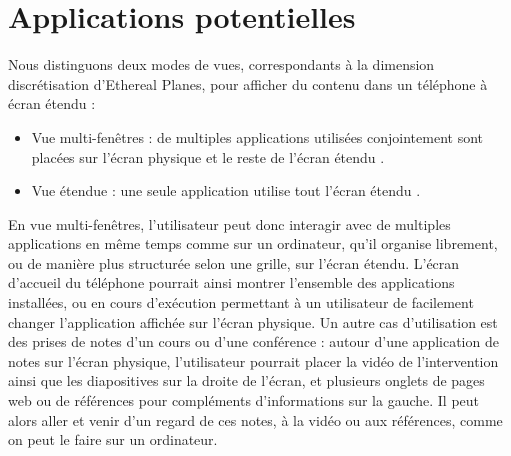 \section{Applications potentielles}
\label{sec:concept_applications}

Nous distinguons deux modes de vues, correspondants à la dimension discrétisation d'Ethereal Planes, pour afficher du contenu dans un téléphone à écran étendu :
\begin{itemize}
  \item Vue multi-fenêtres : de multiples applications utilisées conjointement sont placées sur l'écran physique et le reste de l'écran étendu .
  \item Vue étendue : une seule application utilise tout l'écran étendu .
\end{itemize}
\medskip


En vue multi-fenêtres, l'utilisateur peut donc interagir avec de multiples applications en même temps comme sur un ordinateur, qu'il organise librement, ou de manière plus structurée selon une grille, sur l'écran étendu. L'écran d'accueil du téléphone pourrait ainsi montrer l'ensemble des applications installées, ou en cours d'exécution  permettant à un utilisateur de facilement changer l'application affichée sur l'écran physique. Un autre cas d'utilisation est des prises de notes d'un cours ou d'une conférence : autour d'une application de notes sur l'écran physique, l'utilisateur pourrait placer la vidéo de l'intervention ainsi que les diapositives sur la droite de l'écran, et plusieurs onglets de pages web ou de références pour compléments d'informations sur la gauche. Il peut alors aller et venir d'un regard de ces notes, à la vidéo ou aux références, comme on peut le faire sur un ordinateur.

